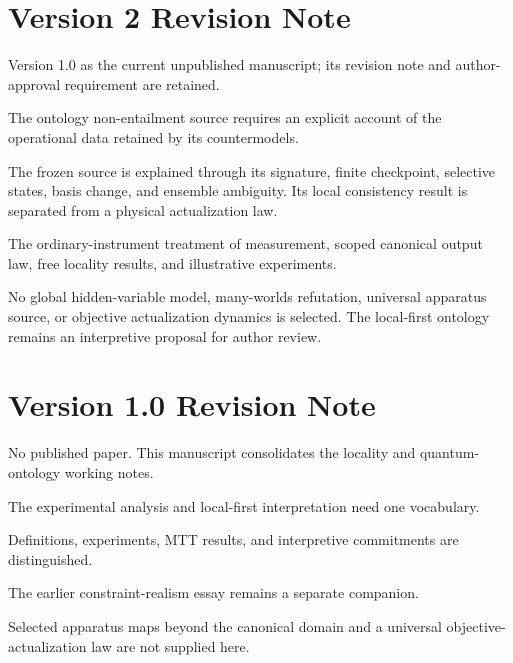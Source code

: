 \documentclass[11pt,a4paper]{article}
\begin{document}
\section*{Version 2 Revision Note}
\begin{description}[style=nextline,itemsep=1pt,topsep=2pt]
\item[Supersedes:] Version 1.0 as the current unpublished manuscript; its
revision note and author-approval requirement are retained.
\item[Reason:] The ontology non-entailment source requires an explicit
account of the operational data retained by its countermodels.
\item[Resolution:] The frozen source is explained through its signature,
finite checkpoint, selective states, basis change, and ensemble ambiguity.
Its local consistency result is separated from a physical actualization law.
\item[Retained:] The ordinary-instrument treatment of measurement, scoped
canonical output law, free locality results, and illustrative experiments.
\item[Open boundary:] No global hidden-variable model, many-worlds refutation,
universal apparatus source, or objective actualization dynamics is selected.
The local-first ontology remains an interpretive proposal for author review.
\end{description}

\section*{Version 1.0 Revision Note}
\begin{description}[style=nextline,itemsep=1pt,topsep=2pt]
\item[Supersedes:] No published paper. This manuscript consolidates the locality and quantum-ontology working notes.
\item[Reason:] The experimental analysis and local-first interpretation need one vocabulary.
\item[Resolution:] Definitions, experiments, MTT results, and interpretive commitments are distinguished.
\item[Retained content:] The earlier constraint-realism essay remains a separate companion.
\item[Remaining boundary:] Selected apparatus maps beyond the canonical domain and a universal objective-actualization law are not supplied here.
\end{description}
\end{document}

